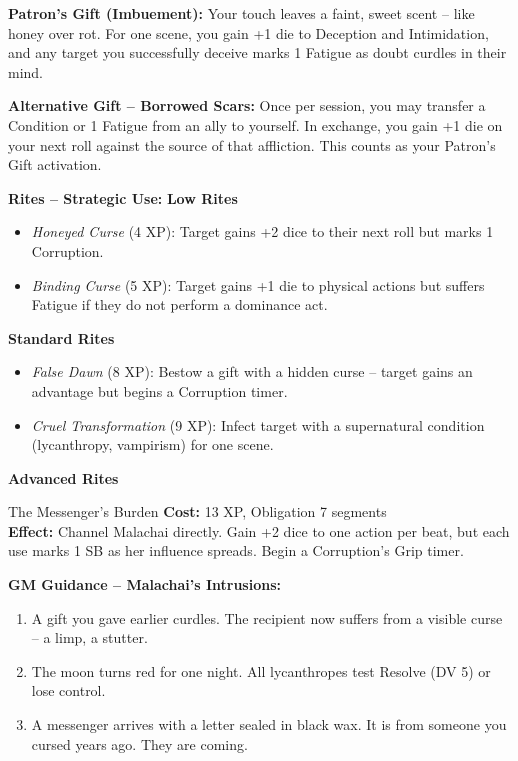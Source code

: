 \documentclass[10pt,a5paper]{book}
\begin{document}
\textbf{Patron's Gift (Imbuement):} Your touch leaves a faint, sweet scent -- like honey over rot. For one scene, you gain +1 die to Deception and Intimidation, and any target you successfully deceive marks 1 Fatigue as doubt curdles in their mind.

\textbf{Alternative Gift -- Borrowed Scars:} Once per session, you may transfer a Condition or 1 Fatigue from an ally to yourself. In exchange, you gain +1 die on your next roll against the source of that affliction. This counts as your Patron's Gift activation.

\textbf{Rites -- Strategic Use:}
\textbf{Low Rites}
\begin{itemize}
    \item \textit{Honeyed Curse} (4 XP): Target gains +2 dice to their next roll but marks 1 Corruption.
    \item \textit{Binding Curse} (5 XP): Target gains +1 die to physical actions but suffers Fatigue if they do not perform a dominance act.
\end{itemize}
\textbf{Standard Rites}
\begin{itemize}
    \item \textit{False Dawn} (8 XP): Bestow a gift with a hidden curse -- target gains an advantage but begins a Corruption timer.
    \item \textit{Cruel Transformation} (9 XP): Infect target with a supernatural condition (lycanthropy, vampirism) for one scene.
\end{itemize}
\textbf{Advanced Rites}
\begin{patronbox}{The Messenger's Burden}
\textbf{Cost:} 13 XP, Obligation 7 segments \\
\textbf{Effect:} Channel Malachai directly. Gain +2 dice to one action per beat, but each use marks 1 SB as her influence spreads. Begin a Corruption's Grip timer.
\end{patronbox}

\textbf{GM Guidance -- Malachai's Intrusions:}
\begin{enumerate}
    \item A gift you gave earlier curdles. The recipient now suffers from a visible curse -- a limp, a stutter.
    \item The moon turns red for one night. All lycanthropes test Resolve (DV 5) or lose control.
    \item A messenger arrives with a letter sealed in black wax. It is from someone you cursed years ago. They are coming.
\end{enumerate}
\end{document}
